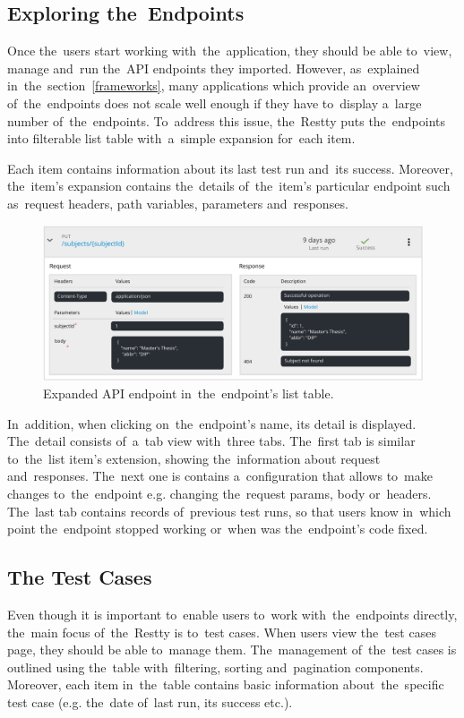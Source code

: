 \subsection{Exploring the~Endpoints}
Once the~users start working with~the~application, they should be able to~view,
manage and~run the~API endpoints they imported. However, as~explained
in~the~section~\ref{frameworks}, many applications which provide an~overview
of~the~endpoints does not scale well enough if they have to~display a~large
number of~the~endpoints. To~address this issue, the~Restty puts the~endpoints
into filterable list table with~a~simple expansion for~each item. 

Each item contains information about its last test run and~its success.
Moreover, the~item's expansion contains the~details of~the~item's particular
endpoint such as~request headers, path variables, parameters and~responses.

\begin{figure}[!hbt]
	\centering
	\includegraphics[scale=0.7]{./designs/api-list.pdf}
	\caption{Expanded API endpoint in~the~endpoint's list table.}
\end{figure}

In~addition, when clicking on~the~endpoint's name, its detail is displayed.
The~detail consists of~a~tab view with~three tabs. The~first tab is similar to~the~list item's extension,
showing the~information about request and~responses. The~next one is contains a~configuration that
allows to~make changes to~the~endpoint e.g. changing the~request params, body or~headers. The~last
tab contains records of~previous test runs, so that users know in~which point the~endpoint stopped working
or~when was the~endpoint's code fixed.

\subsection{The Test Cases}
Even though it is important to~enable users to~work with~the~endpoints directly,
the~main focus of~the~Restty is to~test cases. When users view the~test cases page,
they should be able to~manage them. The~management of~the~test cases is outlined using
the~table with~filtering, sorting and~pagination components. Moreover, each item in~the~table
contains basic information about~the~specific test case (e.g. the~date of~last run, its success etc.).

